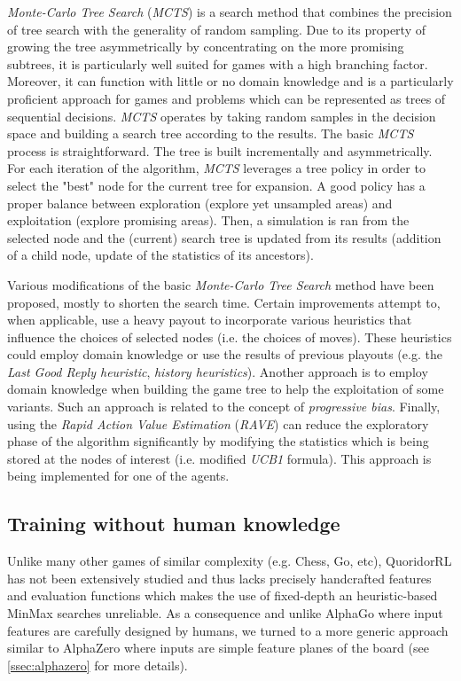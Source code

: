\documentclass[journal, a4paper]{IEEEtran}
\begin{document}
\textit{Monte-Carlo Tree Search} (\textit{MCTS})\cite{mcts-review} is a search method that combines the precision of tree search with the generality of random sampling. Due to its property of growing the tree asymmetrically by concentrating on the more promising subtrees, it is particularly well suited for games with a high branching factor. Moreover, it can function with little or no domain knowledge and is a particularly proficient approach for games and problems which can be represented as trees of sequential decisions. \textit{MCTS} operates by taking random samples in the decision space and building a search tree according to the results. The basic \textit{MCTS} process is straightforward. The tree is built incrementally and asymmetrically. For each iteration of the algorithm, \textit{MCTS} leverages a tree policy in order to select the "best" node for the current tree for expansion. A good policy has a proper balance between exploration (explore yet unsampled areas) and exploitation (explore promising areas). Then, a simulation is ran from the selected node and the (current) search tree is updated from its results (addition of a child node, update of the statistics of its ancestors). 

Various modifications of the basic \textit{Monte-Carlo Tree Search} method have been proposed, mostly to shorten the search time. Certain improvements attempt to, when applicable, use a heavy payout to incorporate various heuristics that influence the choices of selected nodes (i.e. the choices of moves). These heuristics could employ domain knowledge or use the results of previous playouts (e.g. the \textit{Last Good Reply heuristic}, \textit{history heuristics}). Another approach is to employ domain knowledge when building the game tree to help the exploitation of some variants. Such an approach is related to the concept of \textit{progressive bias}. Finally, using the \textit{Rapid Action Value Estimation} (\textit{RAVE}) can reduce the exploratory phase of the algorithm significantly by modifying the statistics which is being stored at the nodes of interest (i.e. modified \textit{UCB1} formula). This approach is being implemented for one of the agents. 

\subsection{Training without human knowledge}
\label{ssec:human-knowledge}
Unlike many other games of similar complexity (e.g. Chess, Go, etc), QuoridorRL has not been extensively studied and thus lacks precisely handcrafted features and evaluation functions which makes the use of fixed-depth an heuristic-based MinMax searches unreliable. As a consequence and unlike AlphaGo\cite{alphago} where input features are carefully designed by humans, we turned to a more generic approach similar to AlphaZero\cite{alphazero} where inputs are simple feature planes of the board (see \ref{ssec:alphazero} for more details).
\end{document}

